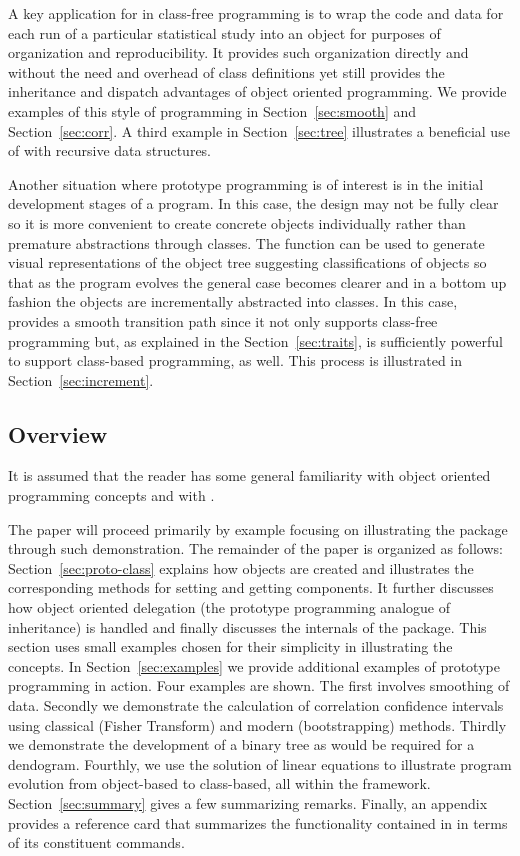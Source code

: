 \documentclass{Z}
\begin{document}
A key application for  in class-free programming is to wrap the code
and data for each run of a particular statistical study into an object for
purposes of organization and reproducibility.  It provides such organization
directly and without the need and overhead of class definitions
yet still provides the
inheritance and dispatch advantages of object oriented programming.  
We provide examples of this style of programming in 
Section~\ref{sec:smooth}
and
Section~\ref{sec:corr}.
A third example in 
Section~\ref{sec:tree} illustrates a beneficial use of  with 
recursive data structures.  

Another situation where prototype programming is of interest is in the initial
development stages of a program.  In this case, the design may not be fully
clear so it is more convenient to create concrete objects individually rather
than premature abstractions through classes.  The 
function can be used to generate visual representations of the object
tree suggesting classifications of objects so that 
as the program evolves the general case becomes clearer and
in a bottom up fashion the objects are incrementally abstracted into 
classes.  In this case,
 provides a smooth transition path since it not only supports
class-free programming but, as explained in the Section~\ref{sec:traits}, is
sufficiently powerful to support class-based programming, as well.   
This process is illustrated in 
Section~\ref{sec:increment}.

\subsection{Overview}

It is assumed that the reader has some general
familiarity with object oriented programming concepts and with
.

The paper will proceed primarily by example focusing on illustrating
the package  through such demonstration.  The remainder of
the paper is organized as follows: Section~\ref{sec:proto-class}
explains how  objects are created and illustrates the
corresponding methods for setting and getting components.  It further
discusses how object oriented delegation (the prototype programming
analogue of inheritance) is handled and finally discusses the
internals of the package.  This section uses small examples chosen for
their simplicity in illustrating the concepts.  In
Section~\ref{sec:examples} we provide additional examples of prototype
programming in action.  Four examples are shown.  The first involves
smoothing of data.  Secondly we demonstrate the calculation of
correlation confidence intervals using classical (Fisher Transform)
and modern (bootstrapping) methods.  Thirdly we demonstrate the
development of a binary tree as would be required for a dendogram.
Fourthly, we use the solution of linear equations to illustrate
program evolution from object-based to class-based, all
within the  framework.
Section~\ref{sec:summary} gives a few summarizing remarks.  Finally,
an appendix provides a reference card that summarizes the
functionality contained in  in terms of its constituent
commands.
\end{document}
